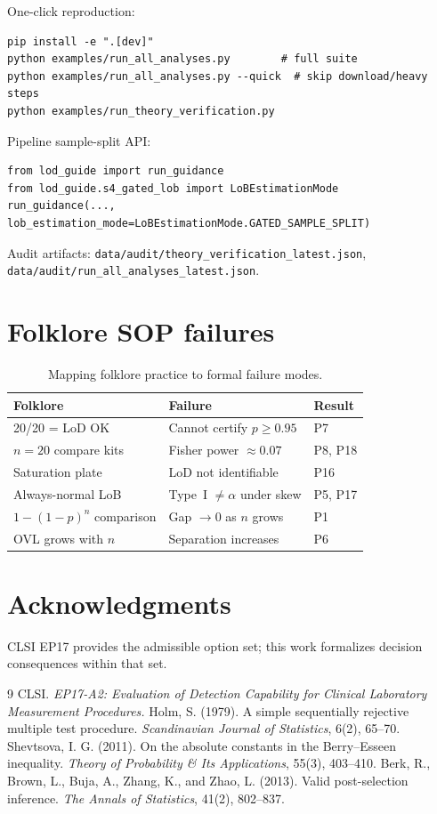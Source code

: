 \documentclass[11pt,a4paper]{article}
\theoremstyle{definition}
\begin{document}
One-click reproduction:
\begin{verbatim}
pip install -e ".[dev]"
python examples/run_all_analyses.py        # full suite
python examples/run_all_analyses.py --quick  # skip download/heavy steps
python examples/run_theory_verification.py
\end{verbatim}

Pipeline sample-split API:
\begin{verbatim}
from lod_guide import run_guidance
from lod_guide.s4_gated_lob import LoBEstimationMode
run_guidance(..., lob_estimation_mode=LoBEstimationMode.GATED_SAMPLE_SPLIT)
\end{verbatim}

Audit artifacts: \texttt{data/audit/theory\_verification\_latest.json},
\texttt{data/audit/run\_all\_analyses\_latest.json}.

\section{Folklore SOP failures}

\begin{table}[h]
\centering
\caption{Mapping folklore practice to formal failure modes.}
\begin{tabular}{@{}lll@{}}
\toprule
Folklore & Failure & Result \\
\midrule
20/20 = LoD OK & Cannot certify $p\ge 0.95$ & P7 \\
$n=20$ compare kits & Fisher power $\approx 0.07$ & P8, P18 \\
Saturation plate & LoD not identifiable & P16 \\
Always-normal LoB & Type~I $\neq\alpha$ under skew & P5, P17 \\
$1-(1-p)^n$ comparison & Gap $\to 0$ as $n$ grows & P1 \\
OVL grows with $n$ & Separation increases & P6 \\
\bottomrule
\end{tabular}
\end{table}

\section*{Acknowledgments}
CLSI EP17 provides the admissible option set; this work formalizes decision
consequences within that set.


\begin{thebibliography}{9}
 CLSI. \emph{EP17-A2: Evaluation of Detection Capability for
  Clinical Laboratory Measurement Procedures.}
 Holm, S. (1979). A simple sequentially rejective multiple test procedure.
  \emph{Scandinavian Journal of Statistics}, 6(2), 65--70.
 Shevtsova, I. G. (2011). On the absolute constants in the
  Berry--Esseen inequality. \emph{Theory of Probability \& Its Applications}, 55(3), 403--410.
 Berk, R., Brown, L., Buja, A., Zhang, K., and Zhao, L. (2013).
  Valid post-selection inference. \emph{The Annals of Statistics}, 41(2), 802--837.
\end{thebibliography}
\end{document}

